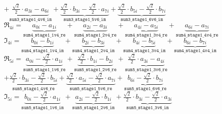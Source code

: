 \vspace{0.4cm}
\hspace{0.3cm}$+ \underbrace{\frac{\sqrt{2}}{2} \cdot a_{3i} -a_{6i}}_{\texttt{sum3\_stage1\_4v6\_im}} + \underbrace{\frac{\sqrt{2}}{2} \cdot b_{3i} -\frac{\sqrt{2}}{2} \cdot a_{7i}}_{\texttt{sum3\_stage1\_5v6\_im}} + \underbrace{\frac{\sqrt{2}}{2} \cdot b_{5i} -\frac{\sqrt{2}}{2} \cdot b_{7i}}_{\texttt{sum3\_stage1\_6v6\_im}}$\\

\vspace{1cm}
\noindent$\Re_{4i} = \underbrace{a_{0i} - a_{1i}}_{\texttt{sum4\_stage1\_1v4\_re}} + \underbrace{a_{2i} - a_{3i}}_{\texttt{sum4\_stage1\_2v4\_re}} + \underbrace{a_{4i} - a_{5i}}_{\texttt{sum4\_stage1\_3v4\_re}} + \underbrace{a_{6i} - a_{7i}}_{\texttt{sum4\_stage1\_4v4\_re}}$\\

\vspace{0.5cm}
\noindent$\Im_{4i} = \underbrace{b_{0i} - b_{1i}}_{\texttt{sum4\_stage1\_1v4\_im}} + \underbrace{b_{2i} - b_{3i}}_{\texttt{sum4\_stage1\_2v4\_im}} + \underbrace{b_{4i} - b_{5i}}_{\texttt{sum4\_stage1\_3v4\_im}} + \underbrace{b_{6i} - b_{7i}}_{\texttt{sum4\_stage1\_4v4\_im}}$\\

\vspace{1cm}
\noindent$\Re_{5i} = \underbrace{a_{0i} -\frac{\sqrt{2}}{2} \cdot a_{1i}}_{\texttt{sum5\_stage1\_1v6\_re}} + \underbrace{\frac{\sqrt{2}}{2} \cdot b_{1i} -b_{2i}}_{\texttt{sum5\_stage1\_2v6\_re}} + \underbrace{\frac{\sqrt{2}}{2} \cdot a_{3i} -a_{4i}}_{\texttt{sum5\_stage1\_3v6\_re}}$\\

\vspace{0.4cm}
\hspace{0.3cm}$+ \underbrace{\frac{\sqrt{2}}{2} \cdot b_{3i} -\frac{\sqrt{2}}{2} \cdot b_{5i}}_{\texttt{sum5\_stage1\_4v6\_re}} + \underbrace{\frac{\sqrt{2}}{2} \cdot a_{5i} -\frac{\sqrt{2}}{2} \cdot a_{7i}}_{\texttt{sum5\_stage1\_5v6\_re}} + \underbrace{b_{6i} -\frac{\sqrt{2}}{2} \cdot b_{7i}}_{\texttt{sum5\_stage1\_6v6\_re}}$\\

\vspace{0.5cm}
\noindent$\Im_{5i} = \underbrace{b_{0i} -\frac{\sqrt{2}}{2} \cdot a_{1i}}_{\texttt{sum5\_stage1\_1v6\_im}} + \underbrace{a_{2i} - \frac{\sqrt{2}}{2} \cdot b_{1i}}_{\texttt{sum5\_stage1\_2v6\_im}} + \underbrace{\frac{\sqrt{2}}{2} \cdot b_{3i} -\frac{\sqrt{2}}{2} \cdot a_{3i}}_{\texttt{sum5\_stage1\_3v6\_im}}$\\

